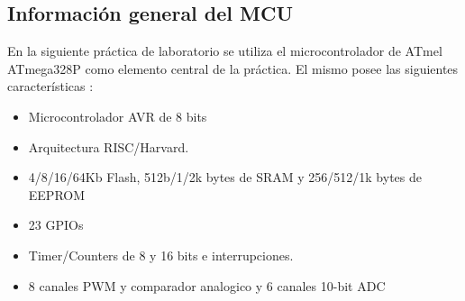 \subsection{Información general del MCU}


En la siguiente práctica de laboratorio se utiliza el microcontrolador de ATmel ATmega328P como
elemento central de la práctica. El mismo posee las siguientes características \cite{ppt}:

\begin{itemize}
    \item Microcontrolador AVR de 8 bits
    \item Arquitectura RISC/Harvard.
    \item 4/8/16/64Kb Flash, 512b/1/2k bytes de
SRAM y 256/512/1k bytes de EEPROM
\item 23 GPIOs
\item Timer/Counters de 8 y 16 bits e interrupciones.
\item 8 canales PWM y comparador
analogico y 6 canales 10-bit ADC
    
\end{itemize}

